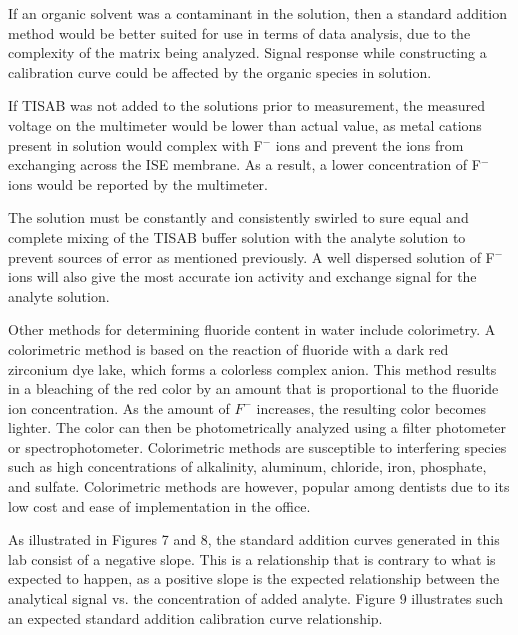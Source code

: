 \documentclass{article}
\begin{document}
If an organic solvent was a contaminant in the solution, then a standard
addition method would be better suited for use in terms of data analysis, due to
the complexity of the matrix being analyzed. Signal response while constructing
a calibration curve could be affected by the organic species in solution.

If TISAB was not added to the solutions prior to measurement, the measured
voltage on the multimeter would be lower than actual value, as metal cations
present in solution would complex with F$^-$ ions and prevent the ions from
exchanging across the ISE membrane. As a result, a lower concentration of F$^-$
ions would be reported by the multimeter.

The solution must be constantly and consistently swirled to sure equal and
complete mixing of the TISAB buffer solution with the analyte solution to
prevent sources of error as mentioned previously. A well dispersed solution of
F$^-$ ions will also give the most accurate ion activity and exchange signal for
the analyte solution.

Other methods for determining fluoride content in water include colorimetry. A
colorimetric method is based on the reaction of fluoride with a dark red
zirconium dye lake, which forms a colorless complex anion. This method results
in a bleaching of the red color by an amount that is proportional to the
fluoride ion concentration. As the amount of $F^-$ increases, the resulting
color becomes lighter. The color can then be photometrically analyzed using a
filter photometer or spectrophotometer. \cite{colo}
Colorimetric methods are susceptible to interfering species such as high
concentrations of alkalinity, aluminum, chloride, iron, phosphate, and sulfate.
Colorimetric methods are however, popular among dentists due to its low cost and
ease of implementation in the office.\cite{burton}

As illustrated in Figures 7 and 8, the standard addition curves generated in
this lab consist of a negative slope. This is a relationship that is contrary to
what is expected to happen, as a positive slope is the expected relationship
between the analytical signal vs. the concentration of added analyte.
Figure 9 illustrates such an expected standard addition calibration curve
relationship. \cite{csun}
\end{document}
